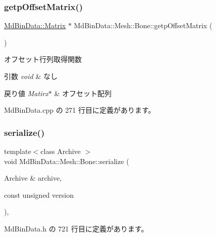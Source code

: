 \subsubsection{\texorpdfstring{getp\+Offset\+Matrix()}{getpOffsetMatrix()}}
{\footnotesize\ttfamily \mbox{\hyperlink{class_md_bin_data_1_1_matrix}{Md\+Bin\+Data\+::\+Matrix}} $\ast$ Md\+Bin\+Data\+::\+Mesh\+::\+Bone\+::getp\+Offset\+Matrix (\begin{DoxyParamCaption}{ }\end{DoxyParamCaption})}



オフセット行列取得関数 


\begin{DoxyParams}{引数}
{\em void} & なし \\
\hline
\end{DoxyParams}

\begin{DoxyRetVals}{戻り値}
{\em Matirx$\ast$} & オフセット配列 \\
\hline
\end{DoxyRetVals}


 Md\+Bin\+Data.\+cpp の 271 行目に定義があります。

\mbox{\label{class_md_bin_data_1_1_mesh_1_1_bone_aa28ecffb26fc5ae631664ae97c099a25}} 
\subsubsection{\texorpdfstring{serialize()}{serialize()}}
{\footnotesize\ttfamily template$<$class Archive $>$ \\
void Md\+Bin\+Data\+::\+Mesh\+::\+Bone\+::serialize (\begin{DoxyParamCaption}\item[{Archive \&}]{archive,  }\item[{const unsigned}]{version }\end{DoxyParamCaption})\hspace{0.3cm}{\ttfamily [inline]}, {\ttfamily [private]}}



 Md\+Bin\+Data.\+h の 721 行目に定義があります。

\mbox{\label{class_md_bin_data_1_1_mesh_1_1_bone_af7edfd3047be8f110d4ab995738c6af3}} 
